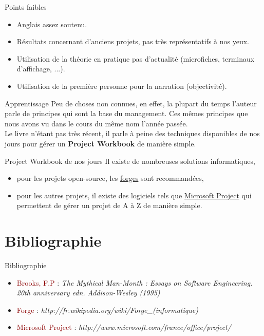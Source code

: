 \documentclass{beamer}
\newcommand{\red}[1]{\textcolor{darkred}{#1}}
\begin{document}
\begin{frame}{Points faibles}
\begin{itemize}
\item Anglais assez soutenu.
\item Résultats concernant d'anciens projets, pas très représentatifs à nos yeux.
\item Utilisation de la théorie en pratique pas d'actualité (microfiches, terminaux d'affichage, ...).
\item Utilisation de la première personne pour la narration (\sout{objectivité}).
\end{itemize}
\end{frame}

\begin{frame}{Apprentissage}
Peu de choses non connues, en effet, la plupart du temps l'auteur parle de principes qui sont la base du management. Ces mêmes 
principes que nous avons vu dans le cours du même nom l'année passée. \\
$ $\\
Le livre n'étant pas très récent, il parle à peine des techniques disponibles de nos jours pour gérer un \textbf{Project Workbook} 
de manière simple.
\end{frame}

\begin{frame}{Project Workbook de nos jours}
Il existe de nombreuses solutions informatiques,
\begin{itemize}
\item pour les projets open-source, les \href{http://fr.wikipedia.org/wiki/Forge_(informatique)}{forges} sont recommandées,
\item pour les autres projets, il existe des logiciels tels que \href{http://www.microsoft.com/france/office/project/}{Microsoft 
Project} qui permettent de gérer un projet de A à Z de manière simple.
\end{itemize}
\end{frame}

\section{Bibliographie}

\begin{frame}{Bibliographie}
\begin{itemize}
\item[\red{\textbullet}] \red{Brooks, F.P} : \textit{The Mythical Man-Month : Essays on Software Engineering. 20th anniversary 
edn. Addison-Wesley (1995)}
\item[\red{\textbullet}] \red{Forge} : \textit{http://fr.wikipedia.org/wiki/Forge\_(informatique)}
\item[\red{\textbullet}] \red{Microsoft Project} : \textit{http://www.microsoft.com/france/office/project/}
\end{itemize}
\end{frame}
\end{document}
